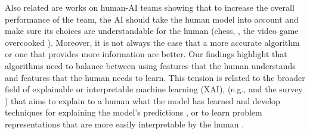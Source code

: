 Also related are works on human-AI teams showing that to increase the overall performance of the team, the AI should take the human model into account and make sure its choices are understandable for the human (chess, \cite{hamade2024}, the video game overcooked \cite{carroll2019utility}). Moreover, it is not always the case that a more accurate algorithm \cite{bansal2021most, bansal2019} or one that provides more information \cite{xu2024persuasion} 
are better.
%
Our findings highlight that algorithms need to balance between using features that the human understands and features that the human needs to learn.
This tension is related to the broader field of explainable or interpretable machine learning (XAI), (e.g., \cite{samek2017explainable, finkelstein2022explainable, heuillet2021explainability} and the survey \cite{arrieta2020explainable}) that aims to explain to a human what the model has learned and develop techniques for explaining the model's predictions \cite{singh2020explainable, bach2015pixel},
or to learn problem representations that are more easily interpretable by the human 
\cite{hilgard2021learning,mahendran2015understanding,nguyen2016multifaceted, nahumdecongestion}.   





